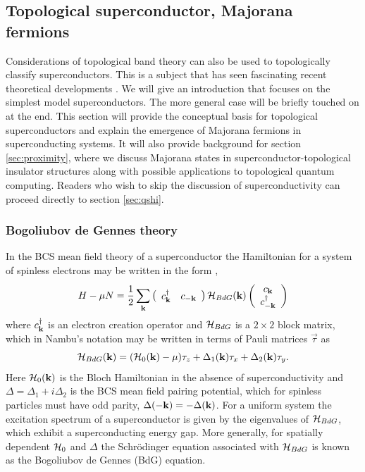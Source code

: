 \documentclass[twocolumn,floatfix,showpacs,rmp,aps]{revtex4}
\begin{document}
\subsection{Topological superconductor, Majorana fermions}
\label{sec:superconductor}

Considerations of topological band theory can also be used to
topologically classify superconductors.  This is a subject that has seen
fascinating recent theoretical
developments \cite{schnyder08,kitaev09,qihughesraduzhang09,roy08}.
We will give an introduction that focuses on the simplest
model superconductors.  The more
general case will be briefly touched on at the end.  This section will provide
the conceptual basis for topological superconductors and explain
the emergence of Majorana fermions in superconducting
systems.  It will also provide background for section \ref{sec:proximity}, where we
discuss Majorana states in superconductor-topological
insulator structures along with possible applications to topological
quantum computing.  Readers who wish to skip the discussion of superconductivity
can proceed directly to section \ref{sec:qshi}.

\subsubsection{Bogoliubov de Gennes theory}
\label{sec:bdg}

In the BCS mean field theory of a superconductor the Hamiltonian for a system
of spinless electrons may be written in the form \cite{degennes66},
\begin{equation}
H-\mu N =
\frac{1}{2}\sum_{\bf k} \left(\begin{array}{cc} c_{\bf k}^\dagger & c_{-{\bf k}} \end{array}\right)
{\cal H}_{BdG}({\bf k})
\left(\begin{array}{c} c_{\bf k} \\ c_{-{\bf k}}^\dagger \end{array}\right)
\label{bdg}
\end{equation}
where $c_{\bf k}^\dagger$ is an electron creation operator and
${\cal H}_{BdG}$ is a $2 \times 2$ block matrix, which in Nambu's notation
may be written in terms of Pauli matrices $\vec\tau$ as
\begin{equation}
{\cal H}_{BdG}({\bf k}) = ({\cal H}_0({\bf k})-\mu) \tau_z + \Delta_1({\bf k})
\tau_x + \Delta_2({\bf k}) \tau_y.
\end{equation}
Here ${\cal H}_0({\bf k})$ is the Bloch Hamiltonian in the absence of
superconductivity and $\Delta = \Delta_1 + i\Delta_2$ is the BCS mean
field pairing potential, which for spinless particles must have odd parity,
$\Delta(-{\bf k}) = -\Delta({\bf k})$.
For a uniform system the excitation spectrum
of a superconductor is given by the eigenvalues of ${\cal
H}_{BdG}$, which exhibit a superconducting energy gap.  More generally, for
spatially dependent ${\cal H}_0$ and
$\Delta$ the Schr\"odinger equation associated with ${\cal H}_{BdG}$ is
known as the Bogoliubov de Gennes (BdG) equation.
\end{document}
